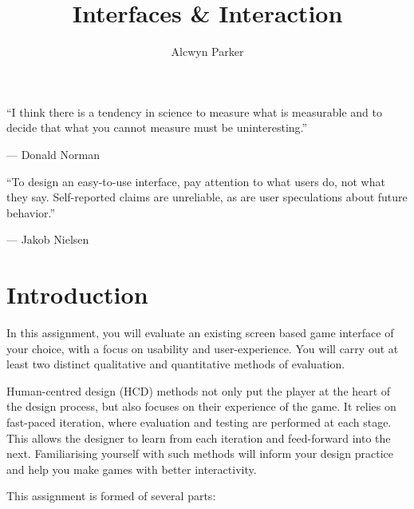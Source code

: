 \documentclass{../fal_assignment}
\title{Interfaces \& Interaction}
\author{Alcwyn Parker}
\begin{document}
\maketitle

\begin{marginquote}
    ``I think there is a tendency in science to measure what is measurable and to decide that what you cannot measure must be uninteresting.''
    
    --- Donald Norman
    
    \marginquoterule
    
    ``To design an easy-to-use interface, pay attention to what users do, not what they say. Self-reported claims are unreliable, as are user speculations about future behavior.''
    
    --- Jakob Nielsen
\end{marginquote}

\section*{Introduction}

In this assignment, you will evaluate an existing screen based game interface of your choice, with a focus on usability and user-experience. You will carry out at least two distinct qualitative and quantitative methods of evaluation.

Human-centred design (HCD) methods not only put the player at the heart of the design process, but also focuses on their experience of the game. It relies on fast-paced iteration, where evaluation and testing are performed at each stage. This allows the designer to learn from each iteration and feed-forward into the next. Familiarising yourself with such methods will inform your design practice and help you make games with better interactivity.  

This assignment is formed of several parts:
\end{document}
